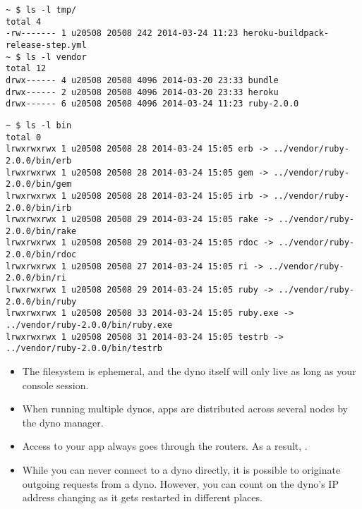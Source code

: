 \begin{verbatim}
~ $ ls -l tmp/
total 4
-rw------- 1 u20508 20508 242 2014-03-24 11:23 heroku-buildpack-release-step.yml
~ $ ls -l vendor
total 12
drwx------ 4 u20508 20508 4096 2014-03-20 23:33 bundle
drwx------ 2 u20508 20508 4096 2014-03-20 23:33 heroku
drwx------ 6 u20508 20508 4096 2014-03-24 11:23 ruby-2.0.0
\end{verbatim}

\begin{verbatim}
~ $ ls -l bin
total 0
lrwxrwxrwx 1 u20508 20508 28 2014-03-24 15:05 erb -> ../vendor/ruby-2.0.0/bin/erb
lrwxrwxrwx 1 u20508 20508 28 2014-03-24 15:05 gem -> ../vendor/ruby-2.0.0/bin/gem
lrwxrwxrwx 1 u20508 20508 28 2014-03-24 15:05 irb -> ../vendor/ruby-2.0.0/bin/irb
lrwxrwxrwx 1 u20508 20508 29 2014-03-24 15:05 rake -> ../vendor/ruby-2.0.0/bin/rake
lrwxrwxrwx 1 u20508 20508 29 2014-03-24 15:05 rdoc -> ../vendor/ruby-2.0.0/bin/rdoc
lrwxrwxrwx 1 u20508 20508 27 2014-03-24 15:05 ri -> ../vendor/ruby-2.0.0/bin/ri
lrwxrwxrwx 1 u20508 20508 29 2014-03-24 15:05 ruby -> ../vendor/ruby-2.0.0/bin/ruby
lrwxrwxrwx 1 u20508 20508 33 2014-03-24 15:05 ruby.exe -> ../vendor/ruby-2.0.0/bin/ruby.exe
lrwxrwxrwx 1 u20508 20508 31 2014-03-24 15:05 testrb -> ../vendor/ruby-2.0.0/bin/testrb
\end{verbatim}

\begin{itemize}
\item
The filesystem is ephemeral, and the dyno itself will only live as long as your console session.
\item
When running multiple dynos, apps are distributed across several nodes
by the dyno manager. 

\item
Access to your app always goes through the routers.
As a result, . 

\item
While you can never connect to a dyno directly, it is possible to
originate outgoing requests from a dyno. 
However, you can count on the
dyno’s IP address changing as it gets restarted in different places.
\end{itemize}


